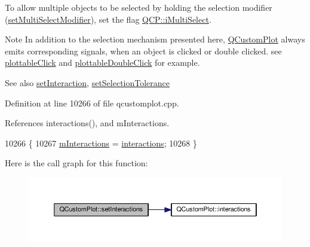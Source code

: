 To allow multiple objects to be selected by holding the selection modifier (\hyperlink{class_q_custom_plot_a8fc96e3b5138a06759a2a90c166df516}{set\+Multi\+Select\+Modifier}), set the flag \hyperlink{namespace_q_c_p_a2ad6bb6281c7c2d593d4277b44c2b037aef673112c5067c3cf4cfddb62da7265d}{Q\+C\+P\+::i\+Multi\+Select}.

\begin{DoxyNote}{Note}
In addition to the selection mechanism presented here, \hyperlink{class_q_custom_plot}{Q\+Custom\+Plot} always emits corresponding signals, when an object is clicked or double clicked. see \hyperlink{class_q_custom_plot_a57e5efa8a854620e9bf62d31fc139f53}{plottable\+Click} and \hyperlink{class_q_custom_plot_af2e6f1cea923dae437681d01ce7d0c31}{plottable\+Double\+Click} for example.
\end{DoxyNote}
\begin{DoxySeeAlso}{See also}
\hyperlink{class_q_custom_plot_a422bf1bc6d56dac75a3d805d9a65902c}{set\+Interaction}, \hyperlink{class_q_custom_plot_a4dc31241d7b09680950e19e5f971ed93}{set\+Selection\+Tolerance} 
\end{DoxySeeAlso}


Definition at line 10266 of file qcustomplot.\+cpp.



References interactions(), and m\+Interactions.


\begin{DoxyCode}
10266                                                                      \{
10267   \hyperlink{class_q_custom_plot_ad717377ceba7493b4b32f0bcbbdf1895}{mInteractions} = \hyperlink{class_q_custom_plot_a12401c02b6949a717f5749bb28c62983}{interactions};
10268 \}
\end{DoxyCode}


Here is the call graph for this function\+:\nopagebreak
\begin{figure}[H]
\begin{center}
\leavevmode
\includegraphics[width=350pt]{class_q_custom_plot_a5ee1e2f6ae27419deca53e75907c27e5_cgraph}
\end{center}
\end{figure}


